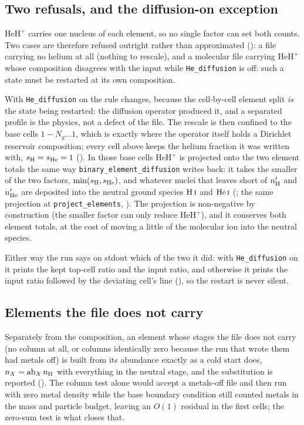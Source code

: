 \documentclass[english,a4paper]{my_memo}
\begin{document}
\subsection{Two refusals, and the diffusion-on exception}

$\mathrm{HeH^+}$ carries one nucleus of each element, so no single factor
can set both counts. Two cases are therefore refused outright rather than
approximated (): a file carrying no helium at all
(nothing to rescale), and a molecular file carrying $\mathrm{HeH^+}$ whose
composition disagrees with the input while \verb|He_diffusion| is off:
such a state must be restarted at its own composition.

With \verb|He_diffusion| on the rule changes, because the cell-by-cell
element split \emph{is} the state being restarted: the diffusion operator
produced it, and a separated profile is the physics, not a defect of the
file. The rescale is then confined to the base cells $1-N_g \ldots 1$,
which is exactly where the operator itself holds a Dirichlet reservoir
composition; every cell above keeps the helium fraction it was written with,
$s_{\rm H} = s_{\rm He} = 1$ (). In those base
cells $\mathrm{HeH^+}$ is projected onto the two element totals the same way
\verb|binary_element_diffusion| writes back: it takes the smaller of the two
factors, $\min(s_{\rm H}, s_{\rm He})$, and whatever nuclei that leaves
short of $n'_{\rm H}$ and $n'_{\rm He}$ are deposited into the neutral
ground species $\mathrm{H\,\textsc{i}}$ and $\mathrm{He\,\textsc{i}}$
(; the same projection at
\verb|project_elements|, ).
The projection is
non-negative by construction (the smaller factor can only reduce
$\mathrm{HeH^+}$), and it conserves both element totals, at the cost of
moving a little of the molecular ion into the neutral species.

Either way the run says on stdout which of the two it did: with
\verb|He_diffusion| on it prints the kept top-cell ratio and the input
ratio, and otherwise it prints the input ratio followed by the deviating
cell's line (), so the restart is never silent.

\subsection{Elements the file does not carry}

Separately from the composition, an element whose stages the file does not
carry (no column at all, or columns identically zero because the run that
wrote them had metals off) is built from its abundance exactly as a cold
start does, $n_X = \mathrm{ab}_X\, n_{\rm H}$ with everything in the neutral
stage, and the substitution is reported
(). The column test alone would accept a
metals-off file and then run with zero metal density while the base boundary
condition still counted metals in the mass and particle budget, leaving an
$O(1)$ residual in the first cells; the zero-sum test is what closes that.
\end{document}
